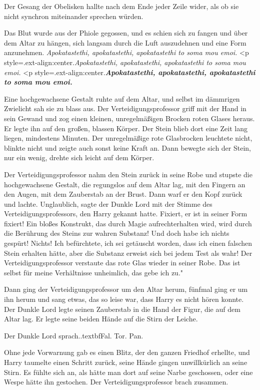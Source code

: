 Der Gesang der Obelisken hallte nach dem Ende jeder Zeile wider, als ob sie
nicht synchron miteinander sprechen würden.

Das Blut wurde aus der Phiole gegossen, und es schien sich zu fangen und über
dem Altar zu hängen, sich langsam durch die Luft auszudehnen und eine Form
anzunehmen.  \emph{Apokatastethi,
apokatastethi, apokatastethi to soma mou emoi.}   <p
style=\grqq{}.ext-align:center\grqq{}.\emph{Apokatastethi, apokatastethi,
apokatastethi to soma mou emoi.}   <p
style=\grqq{}.ext-align:center\grqq{}.\textbf{\emph{Apokatastethi,
apokatastethi, apokatastethi to soma mou emoi.} }

Eine hochgewachsene Gestalt ruhte auf dem Altar, und selbst im dämmrigen
Zwielicht sah sie zu blass aus. Der Verteidigungsprofessor griff mit der Hand in
sein Gewand und zog einen kleinen, unregelmäßigen Brocken roten Glases heraus.
Er legte ihn auf den großen, blassen Körper. Der Stein blieb dort eine Zeit lang
liegen, mindestens Minuten. Der unregelmäßige rote Glasbrocken leuchtete nicht,
blinkte nicht und zeigte auch sonst keine Kraft an. Dann bewegte sich der Stein,
nur ein wenig, drehte sich leicht auf dem Körper.

Der Verteidigungsprofessor nahm den Stein zurück in seine Robe und stupste die
hochgewachsene Gestalt, die regungslos auf dem Altar lag, mit den Fingern an den
Augen, mit dem Zauberstab an der Brust. Dann warf er den Kopf zurück und lachte.
\glqq{}Unglaublich\grqq{}, sagte der Dunkle Lord mit der Stimme des
Verteidigungsprofessors, den Harry gekannt hatte. \glqq{}Fixiert, er ist in
seiner Form fixiert! Ein bloßes Konstrukt, das durch Magie aufrechterhalten
wird, wird durch die Berührung des Steins zur wahren Substanz! Und doch habe ich
nichts gespürt! Nichts! Ich befürchtete, ich sei getäuscht worden, dass ich
einen falschen Stein erhalten hätte, aber die Substanz erweist sich bei jedem
Test als wahr!\grqq{} Der Verteidigungsprofessor verstaute das rote Glas wieder
in seiner Robe. \glqq{}Das ist selbst für meine Verhältnisse unheimlich, das gebe
ich zu."

Dann ging der Verteidigungsprofessor um den Altar herum, fünfmal ging er um ihn
herum und sang etwas, das so leise war, dass Harry es nicht hören konnte. Der
Dunkle Lord legte seinen Zauberstab in die Hand der Figur, die auf dem Altar
lag. Er legte seine beiden Hände auf die Stirn der Leiche.

Der Dunkle Lord sprach.\grqq{}.textbf{Fal. Tor. Pan}.\grqq{}

Ohne jede Vorwarnung gab es einen Blitz, der den ganzen Friedhof erhellte, und
Harry taumelte einen Schritt zurück, seine Hände gingen unwillkürlich an seine
Stirn. Es fühlte sich an, als hätte man dort auf seine Narbe geschossen, oder
eine Wespe hätte ihn gestochen. Der Verteidigungsprofessor brach zusammen.

